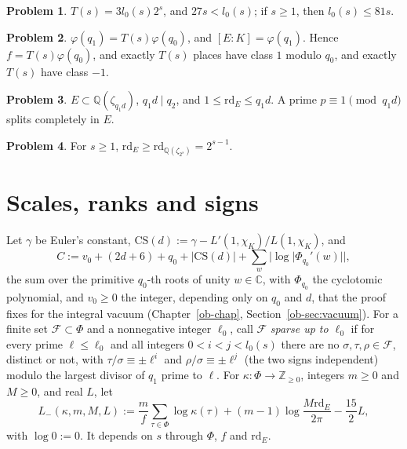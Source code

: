 \documentclass[reqno]{amsart}
\newcounter{chap}
\theoremstyle{plain}
\theoremstyle{definition}
\newtheorem{problem}{Problem}[section]
\newcommand{\Z}{{\mathbb{Z}}}
\newcommand{\Q}{{\mathbb{Q}}}
\newcommand{\C}{{\mathbb{C}}}
\newcommand{\rd}{\mathrm{rd}}
\newcommand{\CS}{\mathrm{CS}}
\begin{document}
\begin{problem}\label{pr:l0}
\(T(s) = 3 l_0(s) 2^s\), and \(27 s < l_0(s)\); if \(s \ge 1\), then \(l_0(s) \le 81 s\).
\end{problem}

\begin{problem}\label{pr:degree}
\(\varphi(q_1) = T(s)\varphi(q_0)\), and \([E : K] = \varphi(q_1)\).  Hence \(f = T(s)\varphi(q_0)\), and exactly \(T(s)\) places have class \(1\) modulo \(q_0\), and exactly \(T(s)\) have class \(-1\).
\end{problem}

\begin{problem}\label{pr:rd}
\(E \subset \Q(\zeta_{q_1 d})\), \(q_1 d \mid q_2\), and \(1 \le \rd_E \le q_1 d\).  A prime \(p \equiv 1 \pmod{q_1 d}\) splits completely in \(E\).
\end{problem}

\begin{problem}\label{pr:rd-lower}
For \(s \ge 1\), \(\rd_E \ge \rd_{\Q(\zeta_{2^s})} = 2^{s-1}\).
\end{problem}

\section{Scales, ranks and signs}\label{sec:data}

Let \(\gamma\) be Euler's constant, \(\CS(d) := \gamma - L'(1, \chi_K)/L(1, \chi_K)\), and
\[
  C := v_0 + (2d + 6) + q_0 + \lvert \CS(d) \rvert + \sum_{w} \bigl\lvert \log \lvert \Phi_{q_0}'(w) \rvert \bigr\rvert ,
\]
the sum over the primitive \(q_0\)-th roots of unity \(w \in \C\), with \(\Phi_{q_0}\) the cyclotomic polynomial, and \(v_0 \ge 0\) the integer, depending only on \(q_0\) and \(d\), that the proof fixes for the integral vacuum (Chapter~\ref{ob-chap}, Section~\ref{ob-sec:vacuum}).  For a finite set \(\mathcal F \subset \Phi\) and a nonnegative integer \(\ell_0\), call \(\mathcal F\) \emph{sparse up to \(\ell_0\)} if for every prime \(\ell \le \ell_0\) and all integers \(0 < i < j < l_0(s)\) there are no \(\sigma, \tau, \rho \in \mathcal F\), distinct or not, with \(\tau/\sigma \equiv \pm \ell^i\) and \(\rho/\sigma \equiv \pm \ell^j\) (the two signs independent) modulo the largest divisor of \(q_1\) prime to \(\ell\).  For \(\kappa \colon \Phi \to \Z_{\ge 0}\), integers \(m \ge 0\) and \(M \ge 0\), and real \(L\), let
\[
  L_-(\kappa, m, M, L) := \frac mf \sum_{\tau \in \Phi} \log \kappa(\tau) + (m - 1) \log \frac{M \rd_E}{2\pi} - \frac{15}{2} L ,
\]
with \(\log 0 := 0\).  It depends on \(s\) through \(\Phi\), \(f\) and \(\rd_E\).
\end{document}
